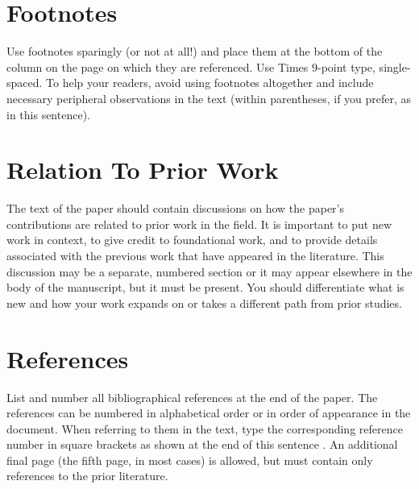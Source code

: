 \documentclass{article}
\begin{document}
\section{Footnotes}
\label{sec:foot}

Use footnotes sparingly (or not at all!) and place them at the bottom of the column on the page on which they are referenced. Use Times 9-point type,
single-spaced. To help your readers, avoid using footnotes altogether and include necessary peripheral observations in the text (within parentheses, if
you prefer, as in this sentence).

\section{Relation To Prior Work}
\label{sec:prior}

The text of the paper should contain discussions on how the paper's contributions are related to prior work in the field. It is important to put new work in  context, to give credit to foundational work, and to provide details associated with the previous work that have appeared in the literature. This discussion may be a separate, numbered section or it may appear elsewhere in the body of the manuscript, but it must be present. You should differentiate what is new and how your work expands on or takes a different path from prior studies.

\section{References}
\label{sec:ref}

List and number all bibliographical references at the end of the paper.  The references can be numbered in alphabetical order or in order of appearance in the document.  When referring to them in the text, type the corresponding reference number in square brackets as shown at the end of this sentence \cite{Smith,Jones}. An additional final page (the fifth page, in most cases) is allowed, but must contain only references to the prior literature.



\end{document}
